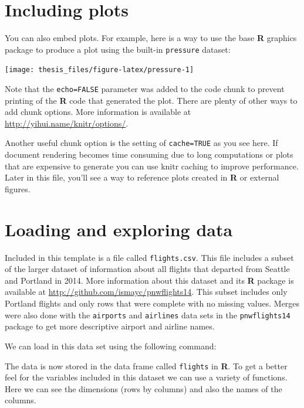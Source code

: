 \documentclass[print]{nuthesis}
\begin{document}
\hypertarget{including-plots}{%
\section{Including plots}\label{including-plots}}

You can also embed plots. For example, here is a way to use the base \textbf{R} graphics package to produce a plot using the built-in \texttt{pressure} dataset:

\begin{center}\texttt{[image: thesis\_files/figure-latex/pressure-1]} \end{center}

Note that the \texttt{echo=FALSE} parameter was added to the code chunk to prevent printing of the \textbf{R} code that generated the plot. There are plenty of other ways to add chunk options. More information is available at \url{http://yihui.name/knitr/options/}.

Another useful chunk option is the setting of \texttt{cache=TRUE} as you see here. If document rendering becomes time consuming due to long computations or plots that are expensive to generate you can use knitr caching to improve performance. Later in this file, you'll see a way to reference plots created in \textbf{R} or external figures.

\hypertarget{loading-and-exploring-data}{%
\section{Loading and exploring data}\label{loading-and-exploring-data}}

Included in this template is a file called \texttt{flights.csv}. This file includes a subset of the larger dataset of information about all flights that departed from Seattle and Portland in 2014. More information about this dataset and its \textbf{R} package is available at \url{http://github.com/ismayc/pnwflights14}. This subset includes only Portland flights and only rows that were complete with no missing values. Merges were also done with the \texttt{airports} and \texttt{airlines} data sets in the \texttt{pnwflights14} package to get more descriptive airport and airline names.

We can load in this data set using the following command:

The data is now stored in the data frame called \texttt{flights} in \textbf{R}. To get a better feel for the variables included in this dataset we can use a variety of functions. Here we can see the dimensions (rows by columns) and also the names of the columns.
\end{document}
